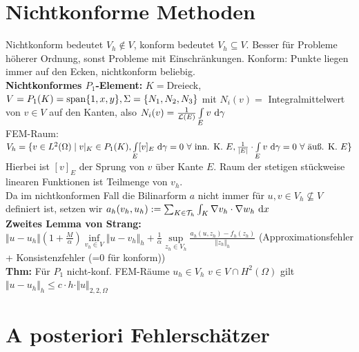 \documentclass[12pt]{scrartcl}
\begin{document}
	\section{Nichtkonforme Methoden}
	
	Nichtkonform bedeutet $V_h\not\in V$, konform bedeutet $V_h\subseteq V$.
	Besser für Probleme höherer Ordnung, sonst Probleme mit Einschränkungen.
	Konform: Punkte liegen immer auf den Ecken, nichtkonform beliebig.\\
	\textbf{Nichtkonformes $P_1$-Element:} $K=$Dreieck, $V=P_1(K)=\operatorname{span}\lbrace 1,x,y\rbrace,\Sigma=\lbrace N_1,N_2,N_3\rbrace$ mit $N_i(v)=$ Integralmittelwert von $v\in V$ auf den Kanten, also $N_i(v)=\frac{1}{\mathcal{L}(E)}\int\limits_E v\text{ d}\gamma$\\
	FEM-Raum: $V_h=\lbrace v\in L^2(\Omega)\mid	v|_K\in P_1(K),\int\limits_E [v]_E\text{ d}\gamma=0~\forall	\text{ inn. K. $E$},	\frac{1}{|E|}\cdot\int\limits_E v\text{ d}\gamma=0~\forall\text{ äuß. K. }E\rbrace$\\
	Hierbei ist $[v]_E$ der Sprung von $v$ über Kante $E$. Raum der stetigen stückweise linearen Funktionen ist Teilmenge von $v_h$.\\
	Da im nichtkonformen Fall die Bilinarform $a$ nicht immer für $u,v\in V_h\not\subseteq V$ definiert ist, setzen wir $a_h(v_h,u_h):=\sum_{K\in\mathcal{T}_h}\int_K \nabla v_h\cdot\nabla w_h\text{ d} x$\\
	\textbf{Zweites Lemma von Strang:} $\Vert u-u_h\Vert(1+\frac{M}{\alpha})\inf\limits_{v_h\in V}\Vert u-v_h\Vert_h+\frac{1}{\alpha}\sup\limits_{z_h\in V_h}\frac{a_h(u,z_h)-f_h(z_h)}{\Vert z_h\Vert_h}$ (Approximationsfehler + Konsistenzfehler (=0 für konform))\\
	\textbf{Thm:} Für $P_1$ nicht-konf. FEM-Räume $u_h\in V_h$ $v\in V\cap H^2(\Omega)$ gilt $\Vert u-u_h\Vert_h\leq c\cdot h\cdot\Vert u\Vert_{2,2,\Omega}$
	
	\section{A posteriori Fehlerschätzer}
	
\end{document}

